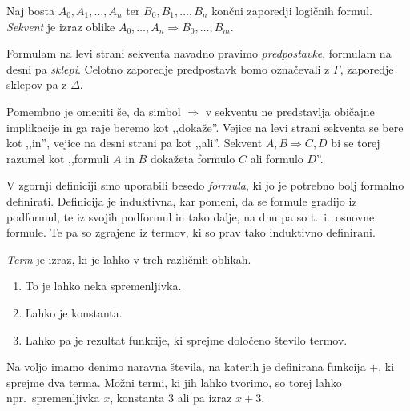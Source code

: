 \begin{definicija}
    Naj bosta $A_0,A_1,\ldots,A_n$ ter $B_0,B_1,\ldots,B_n$ končni zaporedji logičnih formul. \emph{Sekvent} je izraz oblike $A_0,\dots,A_n \Rightarrow B_0,\dots,B_m$.
\end{definicija}

Formulam na levi strani sekventa navadno pravimo \emph{predpostavke}, formulam na desni pa \emph{sklepi}. Celotno zaporedje predpostavk bomo označevali z $\Gamma$, zaporedje sklepov pa z $\Delta$.

Pomembno je omeniti še, da simbol $\Rightarrow$ v sekventu ne predstavlja običajne implikacije in ga raje beremo kot ,,dokaže''. Vejice na levi strani sekventa se bere kot ,,in'', vejice na desni strani pa kot ,,ali''. Sekvent $A,B \Rightarrow C,D$ bi se torej razumel kot ,,formuli $A$ in $B$ dokažeta formulo $C$ ali formulo $D$''.

V zgornji definiciji smo uporabili besedo \emph{formula}, ki jo je potrebno bolj formalno definirati. Definicija je induktivna, kar pomeni, da se formule gradijo iz podformul, te iz svojih podformul in tako dalje, na dnu pa so t.~i.\ osnovne formule. Te pa so zgrajene iz termov, ki so prav tako induktivno definirani.

\begin{definicija}
    \emph{Term} je izraz, ki je lahko v treh različnih oblikah.
    \begin{enumerate}
        \item To je lahko neka spremenljivka.
        \item Lahko je konstanta.
        \item Lahko pa je rezultat funkcije, ki sprejme določeno število termov.
    \end{enumerate}
\end{definicija}
\begin{primer*}
    Na voljo imamo denimo naravna števila, na katerih je definirana funkcija $+$, ki sprejme dva terma. Možni termi, ki jih lahko tvorimo, so torej lahko npr.\ spremenljivka $x$, konstanta $3$ ali pa izraz $x+3$.
\end{primer*}

